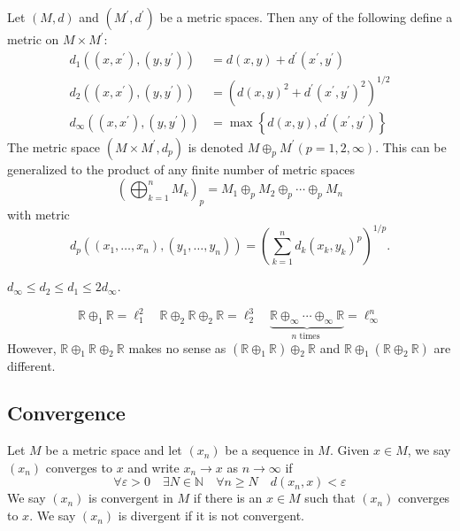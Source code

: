 \documentclass[a4paper]{article}
\begin{document}
\begin{definition}[Products]
    Let $(M, d)$ and $\left(M^{\prime}, d^{\prime}\right)$ be a metric spaces. Then any of the following define a metric on $M \times M^{\prime}:$
    \[
    \begin{aligned}
    d_{1}\left(\left(x, x^{\prime}\right),\left(y, y^{\prime}\right)\right) &=d(x, y)+d^{\prime}\left(x^{\prime}, y^{\prime}\right) \\
    d_{2}\left(\left(x, x^{\prime}\right),\left(y, y^{\prime}\right)\right) &=\left(d(x, y)^{2}+d^{\prime}\left(x^{\prime}, y^{\prime}\right)^{2}\right)^{1 / 2} \\
    d_{\infty}\left(\left(x, x^{\prime}\right),\left(y, y^{\prime}\right)\right) &=\max \left\{d(x, y), d^{\prime}\left(x^{\prime}, y^{\prime}\right)\right\}
    \end{aligned}
    \]
    The metric space $\left(M \times M^{\prime}, d_{p}\right)$ is denoted $M \oplus_{p} M^{\prime}(p=1,2, \infty)$. This can be generalized to the product of any finite number of metric spaces
    \[
        \left( \bigoplus_{k=1}^{n}M_k \right)_p = M_1 \oplus_{p}M_2\oplus_{p}\cdots\oplus_{p}M_n
    \]
    with metric
    \[
        d_p((x_1,\dots,x_n),(y_1,\dots,y_n)) = \left( \sum_{k=1}^n d_k(x_k,y_k)^p \right)^{1/p}.
    \]
\end{definition}
\begin{note}
    $d_{\infty} \leqslant d_{2} \leqslant d_{1} \leqslant 2 d_{\infty}$.
\end{note}
\begin{example}
    \[
\mathbb{R} \oplus_{1} \mathbb{R}=\ell_{1}^{2} \quad \mathbb{R} \oplus_{2} \mathbb{R} \oplus_{2} \mathbb{R}=\ell_{2}^{3} \quad \underbrace{\mathbb{R} \oplus_\infty \cdots \oplus_{\infty} \mathbb{R}}_{n \text { times }}=\ell_{\infty}^{n}
\]
However, $\mathbb{R} \oplus_{1} \mathbb{R} \oplus_{2} \mathbb{R}$ makes no sense as $\left(\mathbb{R} \oplus_{1} \mathbb{R}\right) \oplus_{2} \mathbb{R}$ and $\mathbb{R} \oplus_{1}\left(\mathbb{R} \oplus_{2} \mathbb{R}\right)$ are different.
\end{example}
\subsection{Convergence}
\begin{definition}[Convergence]
    Let $M$ be a metric space and let $\left(x_{n}\right)$ be a sequence in $M$. Given $x \in M$, we say $\left(x_{n}\right)$ converges to $x$ and write $x_{n} \rightarrow x$ as $n \rightarrow \infty$ if
    \[
    \forall \varepsilon>0 \quad \exists N \in \mathbb{N} \quad \forall n \geqslant N \quad d\left(x_{n}, x\right)<\varepsilon
    \]
    We say $\left(x_{n}\right)$ is convergent in $M$ if there is an $x \in M$ such that $\left(x_{n}\right)$ converges to $x$. We say $\left(x_{n}\right)$ is divergent if it is not convergent.
\end{definition}
\end{document}
